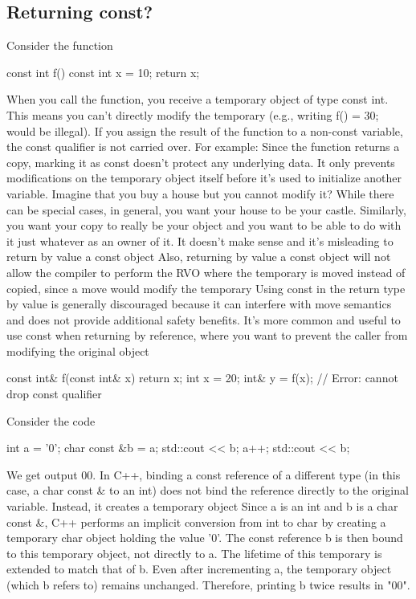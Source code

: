 \documentclass{report}
\begin{document}
\subsection{Returning const?}
\bigbreak \noindent 
Consider the function
\bigbreak \noindent 
\begin{cppcode}
    const int f() {
        const int x = 10;
        return x;
    }
\end{cppcode}
\bigbreak \noindent 
When you call the function, you receive a temporary object of type const int. This means you can’t directly modify the temporary (e.g., writing f() = 30; would be illegal).
\bigbreak \noindent 
If you assign the result of the function to a non-const variable, the const qualifier is not carried over. For example:
\bigbreak \noindent 
Since the function returns a copy, marking it as const doesn’t protect any underlying data. It only prevents modifications on the temporary object itself before it’s used to initialize another variable.
\bigbreak \noindent 
Imagine that you buy a house but you cannot modify it? While
there can be special cases, in general, you want your house to be
your castle. Similarly, you want your copy to really be your object
and you want to be able to do with it just whatever as an owner of
it.
\bigbreak \noindent 
It doesn’t make sense and it’s misleading to return by value a const object
\bigbreak \noindent 
Also, returning by value a const object will not allow the compiler to perform the RVO where the temporary is moved instead of copied, since a move would modify the temporary
\bigbreak \noindent 
Using const in the return type by value is generally discouraged because it can interfere with move semantics and does not provide additional safety benefits. It’s more common and useful to use const when returning by reference, where you want to prevent the caller from modifying the original object
\bigbreak \noindent 
\begin{cppcode}
    const int& f(const int& x) {
        return x;
    }
    int x = 20;
    int& y = f(x); // Error: cannot drop const qualifier
\end{cppcode}

\pagebreak 
{}
\bigbreak \noindent 
Consider the code
\bigbreak \noindent 
\begin{cppcode}
    int a = '0';
    char const &b = a;
    std::cout << b;
    a++;
    std::cout << b;
\end{cppcode}
\bigbreak \noindent 
We get output 00. In C++, binding a const reference of a different type (in this case, a char const & to an int) does not bind the reference directly to the original variable. Instead, it creates a temporary object
\bigbreak \noindent 
Since a is an int and b is a char const \&, C++ performs an implicit conversion from int to char by creating a temporary char object holding the value '0'. The const reference b is then bound to this temporary object, not directly to a. The lifetime of this temporary is extended to match that of b.
\bigbreak \noindent 
Even after incrementing a, the temporary object (which b refers to) remains unchanged. Therefore, printing b twice results in "00".
\end{document}

